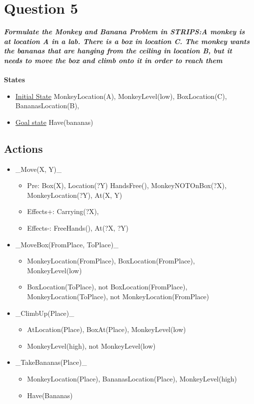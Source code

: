 \documentclass{article}
\newcommand\tab[1][1cm]{\hspace*{#1}}
\begin{document}
\section*{Question 5}
\textbf{\textit{
    \tab Formulate the Monkey and Banana Problem in STRIPS:A monkey is at location A in a lab. There is a box in location C. The monkey wants the bananas that are hanging from the ceiling in location B, but it needs to move the box and climb onto it in order to reach them
}} \\ \\
\textbf{States}
\begin{itemize}
    \item \underline{Initial State} MonkeyLocation(A), MonkeyLevel(low), BoxLocation(C), BananasLocation(B),
    \item \underline{Goal state} Have(bananas)
\end{itemize}

\subsection*{Actions}
\begin{itemize}
    \item \_Move(X, Y)\_
        \begin{itemize}
            \item Pre: Box(X), Location(?Y) HandsFree(), MonkeyNOTOnBox(?X), 
                MonkeyLocation(?Y), At(X, Y)
            \item Effects+: Carrying(?X), 
            \item Effects-: FreeHands(), At(?X, ?Y)
        \end{itemize}
    \item \_MoveBox(FromPlace, ToPlace)\_
        \begin{itemize}
            \item MonkeyLocation(FromPlace), BoxLocation(FromPlace), MonkeyLevel(low)
            \item BoxLocation(ToPlace), not BoxLocation(FromPlace), MonkeyLocation(ToPlace), not MonkeyLocation(FromPlace)
        \end{itemize}
    \item \_ClimbUp(Place)\_
        \begin{itemize}
            \item AtLocation(Place), BoxAt(Place), MonkeyLevel(low)
            \item MonkeyLevel(high), not MonkeyLevel(low)
        \end{itemize}
    \item \_TakeBananas(Place)\_
        \begin{itemize}
            \item MonkeyLocation(Place), BananasLocation(Place), MonkeyLevel(high)
            \item Have(Bananas)
        \end{itemize}
\end{itemize}
\end{document}
